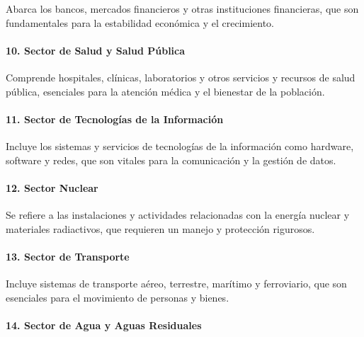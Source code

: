 \documentclass{article}
\begin{document}
Abarca los bancos, mercados financieros y otras instituciones
financieras, que son fundamentales para la estabilidad económica y el
crecimiento.

\hypertarget{sector-de-salud-y-salud-puxfablica}{%
\paragraph{\texorpdfstring{10. \textbf{Sector de Salud y Salud
Pública}}{10. Sector de Salud y Salud Pública}}\label{sector-de-salud-y-salud-puxfablica}}

Comprende hospitales, clínicas, laboratorios y otros servicios y
recursos de salud pública, esenciales para la atención médica y el
bienestar de la población.

\hypertarget{sector-de-tecnologuxedas-de-la-informaciuxf3n}{%
\paragraph{\texorpdfstring{11. \textbf{Sector de Tecnologías de la
Información}}{11. Sector de Tecnologías de la Información}}\label{sector-de-tecnologuxedas-de-la-informaciuxf3n}}

Incluye los sistemas y servicios de tecnologías de la información como
hardware, software y redes, que son vitales para la comunicación y la
gestión de datos.

\hypertarget{sector-nuclear}{%
\paragraph{\texorpdfstring{12. \textbf{Sector
Nuclear}}{12. Sector Nuclear}}\label{sector-nuclear}}

Se refiere a las instalaciones y actividades relacionadas con la energía
nuclear y materiales radiactivos, que requieren un manejo y protección
rigurosos.

\hypertarget{sector-de-transporte}{%
\paragraph{\texorpdfstring{13. \textbf{Sector de
Transporte}}{13. Sector de Transporte}}\label{sector-de-transporte}}

Incluye sistemas de transporte aéreo, terrestre, marítimo y ferroviario,
que son esenciales para el movimiento de personas y bienes.

\hypertarget{sector-de-agua-y-aguas-residuales}{%
\paragraph{\texorpdfstring{14. \textbf{Sector de Agua y Aguas
Residuales}}{14. Sector de Agua y Aguas Residuales}}\label{sector-de-agua-y-aguas-residuales}}
\end{document}
